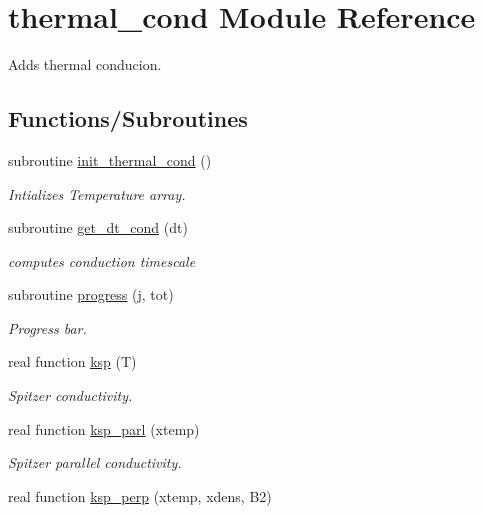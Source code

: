 \hypertarget{namespacethermal__cond}{}\section{thermal\+\_\+cond Module Reference}
\label{namespacethermal__cond}


Adds thermal conducion.  


\subsection*{Functions/\+Subroutines}
\begin{DoxyCompactItemize}
\item 
subroutine \hyperlink{namespacethermal__cond_ac611766519a4602033c83e3ed5ae3c00}{init\+\_\+thermal\+\_\+cond} ()
\begin{DoxyCompactList}\small\item\em Intializes Temperature array. \end{DoxyCompactList}\item 
subroutine \hyperlink{namespacethermal__cond_a074d4829b3477fa8003983819e77523d}{get\+\_\+dt\+\_\+cond} (dt)
\begin{DoxyCompactList}\small\item\em computes conduction timescale \end{DoxyCompactList}\item 
subroutine \hyperlink{namespacethermal__cond_a5283f7a2b8b4a4226ce624fb49445f43}{progress} (j, tot)
\begin{DoxyCompactList}\small\item\em Progress bar. \end{DoxyCompactList}\item 
real function \hyperlink{namespacethermal__cond_ab3978fb62e485cf71d7c83e779e92615}{ksp} (T)
\begin{DoxyCompactList}\small\item\em Spitzer conductivity. \end{DoxyCompactList}\item 
real function \hyperlink{namespacethermal__cond_a8205274631d6cb4d36ffc0937aa88a74}{ksp\+\_\+parl} (xtemp)
\begin{DoxyCompactList}\small\item\em Spitzer parallel conductivity. \end{DoxyCompactList}\item 
real function \hyperlink{namespacethermal__cond_adfd8867a0fc7fe02a35a41000e36f9bf}{ksp\+\_\+perp} (xtemp, xdens, B2)

\end{DoxyCompactItemize}

